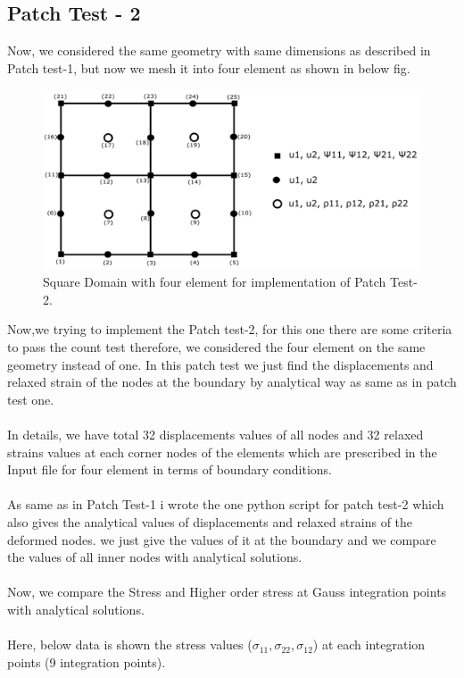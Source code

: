 \documentclass[12pt]{article}
\begin{document}
\subsection{Patch Test - 2}
Now, we considered the same geometry with same dimensions as described in Patch test-1, but now we mesh it into four element as shown in below fig.
\begin{figure}[H]
	\begin{center}
		\includegraphics[scale=0.75]{ele_4.png} 
	\end{center}  
    \caption{Square Domain with four element for implementation of Patch Test-2.}
\end{figure}
Now,we trying to implement the Patch test-2, for this one there are some criteria to pass the count test therefore, we considered the four element on the same geometry instead of one. In this patch test we just find the displacements and relaxed strain of the nodes at the boundary by analytical way as same as in patch test one. 
\\
\\
In details, we have total 32 displacements values of all nodes and 32 relaxed strains values at each corner nodes of the elements which are prescribed in the Input file for four element in terms of boundary conditions.
\\
\\
As same as in Patch Test-1 i wrote the one python script for patch test-2 which also gives the analytical values of displacements and relaxed strains of the deformed nodes. we just give the values of it at the boundary and we compare the values of all inner nodes with analytical solutions. 
\\ \\
Now, we compare the Stress and Higher order stress at Gauss integration points with analytical solutions. \\ \\
Here, below data is shown the stress values ($\sigma_{11},\sigma_{22},\sigma_{12}$) at each integration points (9 integration points).
\end{document}
